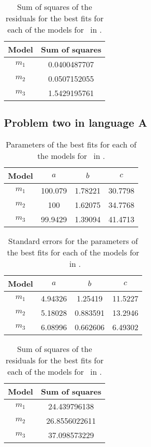 \begin{table}[ht!]
\centering
\begin{tabular}{|c|c|}
\hline
{\bf Model} & Sum of squares \\
\hline
$m_1$ & 0.0400487707\\
\hline
$m_2$ & 0.0507152055\\
\hline
$m_3$ & 1.5429195761\\
\hline
\end{tabular}
\caption{Sum of squares of the residuals for the best fits for each of the models for \PO\ in \LB.}
\label{table:P1LB:abc:sumsquares}
\end{table}

\subsection{Problem two in language A} \label{subsecP2LA}

\begin{table}[ht!]
\centering
\begin{tabular}{|c|c|c|c|}
\hline
{\bf Model} &  $a$ & $b$ & $c$ \\
\hline
$m_1$ & 100.079 & 1.78221 & 30.7798 \\
\hline
$m_2$ & 100 & 1.62075 & 34.7768\\
\hline
$m_3$ & 99.9429 & 1.39094 & 41.4713 \\
\hline
\end{tabular}
\caption{Parameters of the best fits for each of the models for \PT\ in \LA.}
\label{table:P2LA:abc}
\end{table}

\begin{table}[ht!]
\centering
\begin{tabular}{|c|c|c|c|}
\hline
{\bf Model} &  $a$ & $b$ & $c$ \\
\hline
$m_1$ & 4.94326 & 1.25419 & 11.5227 \\
\hline
$m_2$ & 5.18028 & 0.883591 & 13.2946 \\
\hline
$m_3$ & 6.08996 & 0.662606 & 6.49302 \\
\hline
\end{tabular}
\caption{Standard errors for the parameters of the best fits for each of the models for \PT\ in \LA.}
\label{table:P2LA:abc:error}
\end{table}

\begin{table}[ht!]
\centering
\begin{tabular}{|c|c|}
\hline
{\bf Model} & Sum of squares \\
\hline
$m_1$ & 24.439796138\\
\hline
$m_2$ & 26.8556022611\\
\hline
$m_3$ & 37.098573229\\
\hline
\end{tabular}
\caption{Sum of squares of the residuals for the best fits for each of the models for \PT\ in \LA.}
\label{table:P2LA:abc:error}
\end{table}
